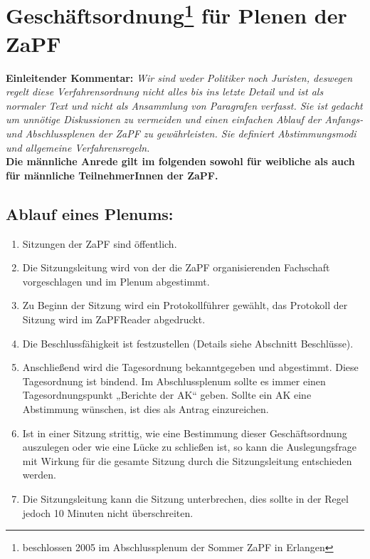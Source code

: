 



\chapter*{Geschäftsordnung\footnote{beschlossen 2005 im Abschlussplenum der Sommer ZaPF in Erlangen} für Plenen der ZaPF}

\textbf{Einleitender Kommentar:}
{\footnotesize\textit{
Wir sind weder Politiker noch Juristen, deswegen regelt diese Verfahrensordnung nicht alles bis ins
letzte Detail und ist als normaler Text und nicht als Ansammlung von Paragrafen verfasst. Sie ist
gedacht um unnötige Diskussionen zu vermeiden und einen einfachen Ablauf der Anfangs- und
Abschlussplenen der ZaPF zu gewährleisten. Sie definiert Abstimmungsmodi und allgemeine
Verfahrensregeln.}}\\[1ex]
\noindent \textbf{Die männliche Anrede gilt im folgenden sowohl für
weibliche als auch für männliche
 TeilnehmerInnen der ZaPF.}

\section*{Ablauf eines Plenums:}
\begin{enumerate}

\item{Sitzungen der ZaPF sind öffentlich.}

\item{Die Sitzungsleitung wird von der die ZaPF organisierenden Fachschaft vorgeschlagen und im
Plenum abgestimmt.}

\item{Zu Beginn der Sitzung wird ein Protokollführer gewählt, das Protokoll der Sitzung wird im ZaPFReader
abgedruckt.}

\item{Die Beschlussfähigkeit ist festzustellen (Details siehe Abschnitt Beschlüsse).}

\item{Anschließend wird die Tagesordnung bekanntgegeben und abgestimmt. Diese Tagesordnung ist
bindend. Im Abschlussplenum sollte es immer einen Tagesordnungspunkt „Berichte der AK“ geben.
Sollte ein AK eine Abstimmung wünschen, ist dies als Antrag einzureichen.}

\item{ Ist in einer Sitzung strittig, wie eine Bestimmung dieser Geschäftsordnung auszulegen oder wie eine
Lücke zu schließen ist, so kann die Auslegungsfrage mit Wirkung für die gesamte Sitzung durch die
Sitzungsleitung entschieden werden.}

\item{Die Sitzungsleitung kann die Sitzung unterbrechen, dies sollte in der Regel jedoch 10 Minuten nicht
überschreiten.}
\end{enumerate}

